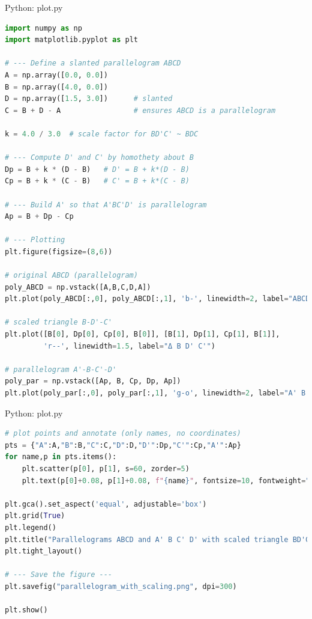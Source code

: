 \documentclass{beamer}
\numberwithin{equation}{section}
\theoremstyle{remark}
\begin{document}
\begin{frame}[fragile]{Python: plot.py}
\begin{lstlisting}[language=Python]
   import numpy as np
import matplotlib.pyplot as plt

# --- Define a slanted parallelogram ABCD
A = np.array([0.0, 0.0])
B = np.array([4.0, 0.0])
D = np.array([1.5, 3.0])      # slanted
C = B + D - A                 # ensures ABCD is a parallelogram

k = 4.0 / 3.0  # scale factor for BD'C' ~ BDC

# --- Compute D' and C' by homothety about B
Dp = B + k * (D - B)   # D' = B + k*(D - B)
Cp = B + k * (C - B)   # C' = B + k*(C - B)

# --- Build A' so that A'BC'D' is parallelogram
Ap = B + Dp - Cp

# --- Plotting
plt.figure(figsize=(8,6))

# original ABCD (parallelogram)
poly_ABCD = np.vstack([A,B,C,D,A])
plt.plot(poly_ABCD[:,0], poly_ABCD[:,1], 'b-', linewidth=2, label="ABCD (original parallelogram)")

# scaled triangle B-D'-C'
plt.plot([B[0], Dp[0], Cp[0], B[0]], [B[1], Dp[1], Cp[1], B[1]],
         'r--', linewidth=1.5, label="Δ B D' C'")

# parallelogram A'-B-C'-D'
poly_par = np.vstack([Ap, B, Cp, Dp, Ap])
plt.plot(poly_par[:,0], poly_par[:,1], 'g-o', linewidth=2, label="A' B C' D' (parallelogram)")
\end{lstlisting}
\end{frame}  
\begin{frame}[fragile]{Python: plot.py}
\begin{lstlisting}[language=Python]
# plot points and annotate (only names, no coordinates)
pts = {"A":A,"B":B,"C":C,"D":D,"D'":Dp,"C'":Cp,"A'":Ap}
for name,p in pts.items():
    plt.scatter(p[0], p[1], s=60, zorder=5)
    plt.text(p[0]+0.08, p[1]+0.08, f"{name}", fontsize=10, fontweight="bold")

plt.gca().set_aspect('equal', adjustable='box')
plt.grid(True)
plt.legend()
plt.title("Parallelograms ABCD and A' B C' D' with scaled triangle BD'C'")
plt.tight_layout()

# --- Save the figure ---
plt.savefig("parallelogram_with_scaling.png", dpi=300)

plt.show()

\end{lstlisting}
\end{frame}  
\end{document}
